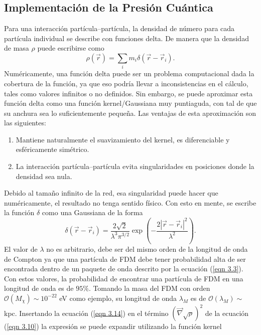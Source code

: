 \documentclass[a4paper,openright,12pt]{book}
\begin{document}
\subsection{Implementación de la Presión Cuántica}
Para una interacción partícula--partícula, la densidad de número para cada partícula individual se describe con funciones delta. De manera que la densidad de masa $\rho$ puede escribirse como
\begin{equation}
\rho(\vec{r})
=
\sum_{i}m_{i}\delta(\vec{r}-\vec{r}_{i}).\label{eqn 3.13}
\end{equation}
Numéricamente, una función delta puede ser un problema computacional dada la cobertura de la función, ya que eso podría llevar a inconsistencias en el cálculo, tales como valores infinitos o no definidos. Sin embargo, se puede aproximar esta función delta como una función kernel/Gaussiana muy puntiaguda, con tal de que su anchura sea lo suficientemente pequeña.
Las ventajas de esta aproximación son las siguientes:
\begin{enumerate}
\item Mantiene naturalmente el suavizamiento del kernel, es diferenciable y esféricamente simétrico. 
\item La interacción partícula--partícula evita singularidades en posiciones donde la densidad sea nula.
\end{enumerate}
Debido al tamaño infinito de la red, esa singularidad puede hacer que numéricamente, el resultado no tenga sentido físico.
Con esto en mente, se escribe la función $\delta$ como una Gaussiana de la forma
\begin{equation}
\delta (\vec{r}-\vec{r}_{i}) = 
\frac{2\sqrt{2}}{\lambda ^{3} \pi ^{3/2}} \exp \left(-\frac{2|\vec{r}-\vec{r}_{i}|^{2}}{\lambda ^{2}}\right).\label{eqn 3.14}
\end{equation}
El valor de $\lambda$ no es arbitrario, debe ser del mismo orden de la longitud de onda de Compton ya que una partícula de FDM debe tener probabilidad alta de ser encontrada dentro de un paquete de onda descrito por la ecuación (\ref{eqn 3.3}). Con estos valores, la probabilidad de encontrar una partícula de FDM en una longitud de onda es de $95 \%$. Tomando la masa del FDM con orden $\mathcal{O}(M_{\chi})\sim 10^{-22}$ eV como ejemplo, su longitud de onda $\lambda_{M}$ es de $\mathcal{O}(\lambda_{M})\sim$ kpc. Insertando la ecuación (\ref{eqn 3.14}) en el término $(\vec{\nabla}\sqrt{\rho})^{2}$ de la ecuación (\ref{eqn 3.10}) la expresión se puede expandir utilizando la función kernel
\end{document}

